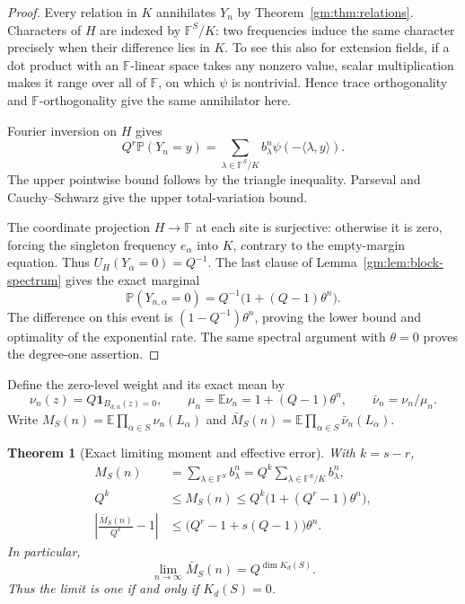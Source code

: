 \documentclass[11pt,a4paper]{article}
\numberwithin{equation}{section}
\newtheorem{theorem}{Theorem}[section]
\theoremstyle{definition}
\theoremstyle{remark}
\newcommand{\F}{\mathbb F}
\newcommand{\E}{\mathbb E}
\newcommand{\PP}{\mathbb P}
\newcommand{\1}{\mathbf 1}
\newcommand{\ip}[2]{\langle #1,#2\rangle}
\begin{document}
\begin{proof}
Every relation in $K$ annihilates $Y_n$ by
Theorem~\ref{gm:thm:relations}. Characters of $H$ are indexed by
$\F^S/K$: two frequencies induce the same character precisely when their
difference lies in $K$. To see this also for extension fields, if a dot
product with an $\F$-linear space takes any nonzero value, scalar
multiplication makes it range over all of $\F$, on which $\psi$ is
nontrivial. Hence trace orthogonality and $\F$-orthogonality give the same
annihilator here.

Fourier inversion on $H$ gives
\begin{equation}\label{gm:eq:inversion}
 Q^r\PP(Y_n=y)=\sum_{\lambda\in\F^S/K}
                  b_\lambda^n\psi(-\ip\lambda y).
\end{equation}
The upper pointwise bound follows by the triangle inequality. Parseval
and Cauchy--Schwarz give the upper total-variation bound.

The coordinate projection $H\to\F$ at each site is surjective: otherwise
it is zero, forcing the singleton frequency $e_\alpha$ into $K$, contrary
to the empty-margin equation. Thus $U_H(Y_\alpha=0)=Q^{-1}$. The last
clause of Lemma~\ref{gm:lem:block-spectrum} gives the exact marginal
\begin{equation}\label{gm:eq:marginal}
 \PP(Y_{n,\alpha}=0)=Q^{-1}\bigl(1+(Q-1)\theta^n\bigr).
\end{equation}
The difference on this event is $(1-Q^{-1})\theta^n$, proving the lower
bound and optimality of the exponential rate. The same spectral argument
with $\theta=0$ proves the degree-one assertion.
\end{proof}

Define the zero-level weight and its exact mean by
\begin{equation}\label{gm:eq:weights}
 \nu_n(z)=Q\1_{B_{d,n}(z)=0},\qquad
 \mu_n=\E\nu_n=1+(Q-1)\theta^n,\qquad
 \bar\nu_n=\nu_n/\mu_n.
\end{equation}
Write $M_S(n)=\E\prod_{\alpha\in S}\nu_n(L_\alpha)$ and
$\bar M_S(n)=\E\prod_{\alpha\in S}\bar\nu_n(L_\alpha)$.

\begin{theorem}[Exact limiting moment and effective error]
\label{gm:thm:moments}
With $k=s-r$,
\begin{align}
 M_S(n)&=\sum_{\lambda\in\F^S}b_\lambda^n
       =Q^k\sum_{\lambda\in\F^S/K}b_\lambda^n,
       \label{gm:eq:raw-moment}\\
 Q^k&\leq M_S(n)\leq Q^k\bigl(1+(Q^r-1)\theta^n\bigr),
       \label{gm:eq:raw-bound}\\
 \left|\frac{\bar M_S(n)}{Q^k}-1\right|
     &\leq\bigl(Q^r-1+s(Q-1)\bigr)\theta^n.
       \label{gm:eq:normalized-bound}
\end{align}
In particular,
\begin{equation}\label{gm:eq:limiting-moment}
 \lim_{n\to\infty}\bar M_S(n)=Q^{\dim K_d(S)}.
\end{equation}
Thus the limit is one if and only if $K_d(S)=0$.
\end{theorem}
\end{document}
